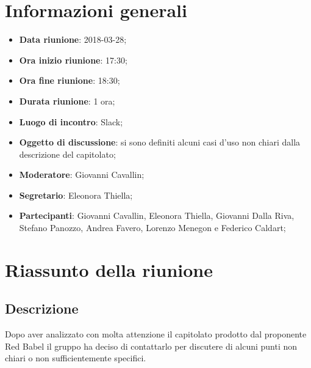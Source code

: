 \section{Informazioni generali}
	\begin{itemize}
		\item \textbf{Data riunione}: 2018-03-28;
		\item \textbf{Ora inizio riunione}: 17:30;
		\item \textbf{Ora fine riunione}: 18:30;
		\item \textbf{Durata riunione}: 1 ora;
		\item \textbf{Luogo di incontro}: Slack;
		\item \textbf{Oggetto di discussione}: si sono definiti alcuni casi d'uso non chiari dalla descrizione del capitolato;
		\item \textbf{Moderatore}: Giovanni Cavallin;
		\item \textbf{Segretario}: Eleonora Thiella;
		\item \textbf{Partecipanti}: Giovanni Cavallin, Eleonora Thiella, Giovanni Dalla Riva, Stefano Panozzo, Andrea Favero, Lorenzo Menegon e Federico Caldart;
	\end{itemize}

\section{Riassunto della riunione}
	\subsection{Descrizione}
	Dopo aver analizzato con molta attenzione il capitolato prodotto dal proponente Red Babel il gruppo ha deciso di contattarlo per discutere di alcuni punti non chiari o non sufficientemente specifici.
